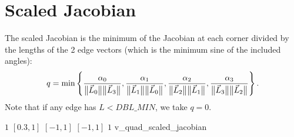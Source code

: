 \section{Scaled Jacobian}

The scaled Jacobian is the minimum of
the Jacobian at each corner divided by the lengths of the 2 edge vectors
(which is the minimum sine of the included angles):
\[
q =
  \min \left\{ \frac {\alpha_0} {\big\lVert{\vec L_0}\big\rVert \big\lVert{\vec L_3}\big\rVert}, 
               \frac {\alpha_1} {\big\lVert{\vec L_1}\big\rVert \big\lVert{\vec L_0}\big\rVert},
               \frac {\alpha_2} {\big\lVert{\vec L_2}\big\rVert \big\lVert{\vec L_1}\big\rVert},
               \frac {\alpha_3} {\big\lVert{\vec L_3}\big\rVert \big\lVert{\vec L_2}\big\rVert}
  \right\}.
\]
Note that if any edge has $L< DBL\_MIN$, we take $q = 0$.

%
{$1$}%
{$[0.3,1]$}%
{$[-1,1]$}%
{$[-1,1]$}%
{$1$}%
{\cite{knu:00}}%
{v\_quad\_scaled\_jacobian}%

